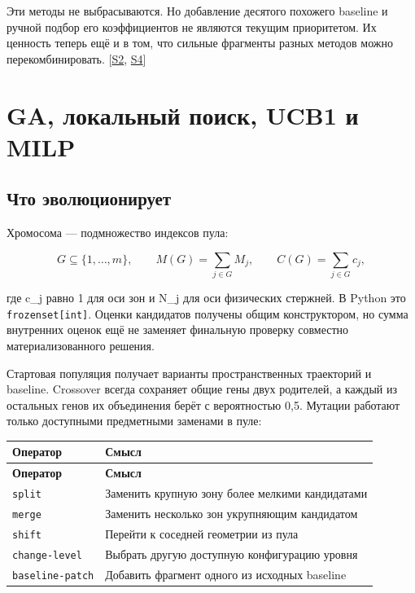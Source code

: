 \documentclass[11pt,a4paper]{article}
\begin{document}
Эти методы не выбрасываются. Но добавление десятого похожего baseline и ручной подбор его коэффициентов не являются текущим приоритетом. Их ценность теперь ещё и в том, что сильные фрагменты разных методов можно перекомбинировать. {\color{Teal}\small[\hyperlink{S2}{S2}, \hyperlink{S4}{S4}]}


\section{GA, локальный поиск, UCB1 и MILP}

\subsection{Что эволюционирует}

Хромосома — подмножество индексов пула:


\[
G\subseteq\{1,\ldots,m\},\qquad
M(G)=\sum_{j\in G}M_j,\qquad
C(G)=\sum_{j\in G}c_j,
\]

где c\_j равно 1 для оси зон и N\_j для оси физических стержней. В Python это {\small\nolinkurl{frozenset[int]}}. Оценки кандидатов получены общим конструктором, но сумма внутренних оценок ещё не заменяет финальную проверку совместно материализованного решения.


Стартовая популяция получает варианты пространственных траекторий и baseline. Crossover всегда сохраняет общие гены двух родителей, а каждый из остальных генов их объединения берёт с вероятностью 0,5. Мутации работают только доступными предметными заменами в пуле:


{\small\setlength{\tabcolsep}{4pt}
\begin{longtable}{@{}L{54.804mm}L{106.384mm}@{}}
\toprule
\textbf{Оператор} & \textbf{Смысл} \\
\midrule\endfirsthead
\toprule
\textbf{Оператор} & \textbf{Смысл} \\
\midrule\endhead
\bottomrule\endfoot
{\small\nolinkurl{split}} & Заменить крупную зону более мелкими кандидатами \\
{\small\nolinkurl{merge}} & Заменить несколько зон укрупняющим кандидатом \\
{\small\nolinkurl{shift}} & Перейти к соседней геометрии из пула \\
{\small\nolinkurl{change-level}} & Выбрать другую доступную конфигурацию уровня \\
{\small\nolinkurl{baseline-patch}} & Добавить фрагмент одного из исходных baseline \\
\end{longtable}}
\end{document}
